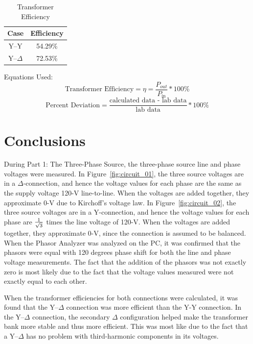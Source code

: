 \documentclass{article}
\begin{document}
\begin{table}[H]
  \centering
  \begin{tabular}{*{2}{c}}
    \textbf{Case} & \textbf{Efficiency} \\

    \hline

    Y--Y        & 54.29\% \\
    Y--$\Delta$ & 72.53\% \\
  \end{tabular}
  \caption{Transformer Efficiency}
  \label{tab:efficiency}
\end{table}



Equations Used:
\[\text{Transformer Efficiency} = \eta = \frac{P_{out}}{P_\text{in}} * 100\% \]
\[\text{Percent Deviation} = \frac{\text{calculated data - lab data}}{\text{lab data}} * 100\%\]

\section{Conclusions}

During Part 1: The Three-Phase Source, the three-phase source line and phase
voltages were measured. In Figure~\ref{fig:circuit_01}, the three source
voltages are in a $\Delta$-connection, and hence the voltage values for each
phase are the same as the supply voltage 120-V line-to-line.  When the voltages
are added together, they approximate 0-V due to Kirchoff's voltage law. In
Figure~\ref{fig:circuit_02}, the three source voltages are in a Y-connection,
and hence the voltage values for each phase are $1 \over \sqrt{3}$ times the line
voltage of 120-V.  When the voltages are added together, they approximate 0-V,
since the connection is assumed to be balanced. When the Phasor Analyzer was
analyzed on the PC, it was confirmed that the phasors were equal with 120
degrees phase shift for both the line and phase voltage measurements. The fact
that the addition of the phasors was not exactly zero is most likely due to the
fact that the voltage values measured were not exactly equal to each other.

When the transformer efficiencies for both connections were calculated, it was
found that the Y--$\Delta$ connection was more efficient than the Y-Y
connection. In the Y--$\Delta$ connection, the secondary $\Delta$ configuration
helped make the transformer bank more stable and thus more efficient. This was
most like due to the fact that a Y--$\Delta$ has no problem with third-harmonic
components in its voltages.
\end{document}

